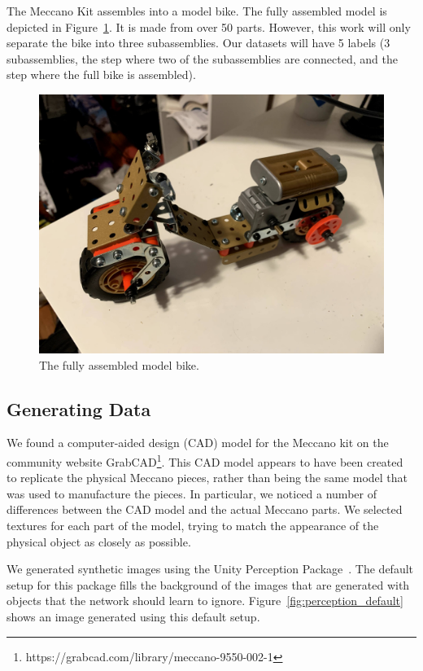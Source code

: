 The Meccano Kit assembles into a model bike.
The fully assembled model is depicted in Figure~\ref{fig:full_bike}.
It is made from over 50 parts.
However, this work will only separate the bike into three subassemblies.
Our datasets will have 5 labels (3 subassemblies, the step where two of the
subassemblies are connected, and the step where the full bike is assembled).

\begin{figure}
  \includegraphics[width=\columnwidth]{figures/synthetic/full_bike.jpg}
  \caption{
    The fully assembled model bike.
  }\label{fig:full_bike}
\end{figure}

\subsection{Generating Data}

We found a computer-aided design (CAD) model for the Meccano kit on the
community website
GrabCAD\footnote{https://grabcad.com/library/meccano-9550-002-1}.
This CAD model appears to have been created to replicate the physical Meccano
pieces, rather than being the same model that was used to manufacture the
pieces.
In particular, we noticed a number of differences between the CAD model and the
actual Meccano parts.
We selected textures for each part of the model, trying to match the
appearance of the physical object as closely as possible.

We generated synthetic images using the Unity Perception Package~\cite{unity}.
The default setup for this package fills the background of the images that are
generated with objects that the network should learn to ignore.
Figure~\ref{fig:perception_default} shows an image generated using this default
setup.


